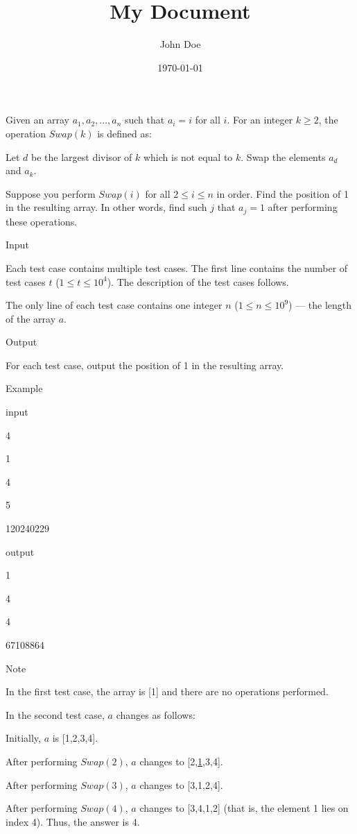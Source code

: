 \documentclass{article}
\title{My Document}
\author{John Doe}
\date{\today}
\begin{document}
\maketitle

Given an array $a_1, a_2, \ldots, a_n$ such that $a_i = i$ for all $i$. For an integer $k \geq 2$, the operation $Swap(k)$ is defined as:

Let $d$ be the largest divisor of $k$ which is not equal to $k$. Swap the elements $a_d$ and $a_k$.

Suppose you perform $Swap(i)$ for all $2 \leq i \leq n$ in order. Find the position of 1 in the resulting array. In other words, find such $j$ that $a_j = 1$ after performing these operations.

Input

Each test case contains multiple test cases. The first line contains the number of test cases $t$ ($1 \leq t \leq 10^4$). The description of the test cases follows.

The only line of each test case contains one integer $n$ ($1 \leq n \leq 10^9$) — the length of the array $a$.

Output

For each test case, output the position of 1 in the resulting array.

Example

input

4

1

4

5

120240229

output

1

4

4

67108864

Note

In the first test case, the array is [1] and there are no operations performed.

In the second test case, $a$ changes as follows:

Initially, $a$ is [1,2,3,4].

After performing $Swap(2)$, $a$ changes to [2,\underline{1},3,4].

After performing $Swap(3)$, $a$ changes to [3,1,2,4].

After performing $Swap(4)$, $a$ changes to [3,4,1,2] (that is, the element 1 lies on index 4). Thus, the answer is 4.
\end{document}
